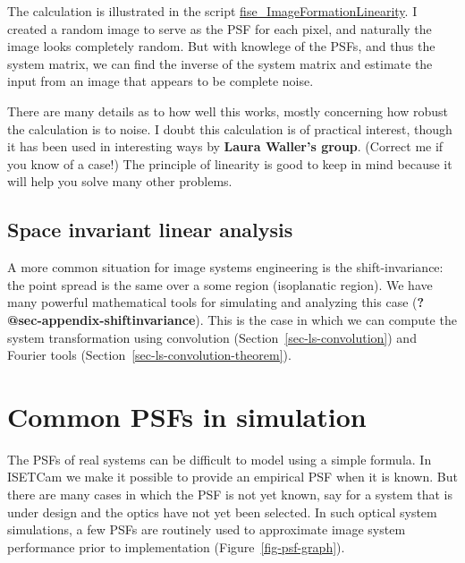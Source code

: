 \documentclass[
  letterpaper,
]{book}
\begin{document}
The calculation is illustrated in the script
\href{../code/02Optics/fise_ImageFormationLinearity.html}{fise\_ImageFormationLinearity}.
I created a random image to serve as the PSF for each pixel, and
naturally the image looks completely random. But with knowlege of the
PSFs, and thus the system matrix, we can find the inverse of the system
matrix and estimate the input from an image that appears to be complete
noise.

There are many details as to how well this works, mostly concerning how
robust the calculation is to noise. I doubt this calculation is of
practical interest, though it has been used in interesting ways by
\textbf{Laura Waller's group}. (Correct me if you know of a case!) The
principle of linearity is good to keep in mind because it will help you
solve many other problems.

\subsection{Space invariant linear
analysis}\label{space-invariant-linear-analysis}

A more common situation for image systems engineering is the
shift-invariance: the point spread is the same over a some region
(isoplanatic region). We have many powerful mathematical tools for
simulating and analyzing this case
(\textbf{?@sec-appendix-shiftinvariance}). This is the case in which we
can compute the system transformation using convolution
(Section~\ref{sec-ls-convolution}) and Fourier tools
(Section~\ref{sec-ls-convolution-theorem}).

\section{Common PSFs in simulation}\label{sec-pointspread-common}

The PSFs of real systems can be difficult to model using a simple
formula. In ISETCam we make it possible to provide an empirical PSF when
it is known. But there are many cases in which the PSF is not yet known,
say for a system that is under design and the optics have not yet been
selected. In such optical system simulations, a few PSFs are routinely
used to approximate image system performance prior to implementation
(Figure~\ref{fig-psf-graph}).
\end{document}
